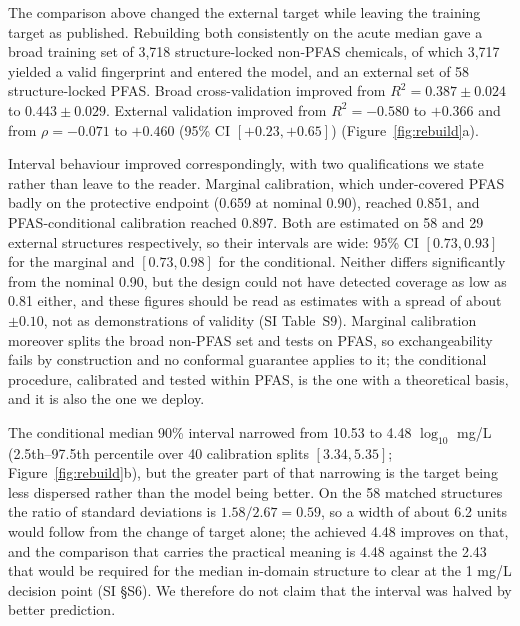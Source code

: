 \documentclass[preprint,12pt]{elsarticle}
\begin{document}
The comparison above changed the external target while leaving the training
target as published. Rebuilding both consistently on the acute median gave a
broad training set of 3{,}718 structure-locked non-PFAS chemicals, of which
3{,}717 yielded a valid fingerprint and entered the model, and an
external set of 58 structure-locked PFAS. Broad cross-validation improved from
$R^2=0.387\pm0.024$ to $0.443\pm0.029$. External validation improved from
$R^2=-0.580$ to $+0.366$ and from $\rho=-0.071$ to $+0.460$ (95\% CI
$[+0.23,+0.65]$) (Figure~\ref{fig:rebuild}a).

Interval behaviour improved correspondingly, with two qualifications we state
rather than leave to the reader. Marginal calibration, which under-covered PFAS
badly on the protective endpoint (0.659 at nominal 0.90), reached 0.851, and
PFAS-conditional calibration reached 0.897. Both are estimated on 58 and 29
external structures respectively, so their intervals are wide: 95\% CI
$[0.73,0.93]$ for the marginal and $[0.73,0.98]$ for the conditional. Neither
differs significantly from the nominal 0.90, but the design could not have
detected coverage as low as 0.81 either, and these figures should be read as
estimates with a spread of about $\pm0.10$, not as demonstrations of validity
(SI Table~S9). Marginal calibration
moreover splits the broad non-PFAS set and tests on PFAS, so exchangeability
fails by construction and no conformal guarantee applies to it; the conditional
procedure, calibrated and tested within PFAS, is the one with a theoretical
basis, and it is also the one we deploy.

The conditional median 90\% interval narrowed from 10.53 to 4.48 $\log_{10}$
mg/L (2.5th--97.5th percentile over 40 calibration splits $[3.34,5.35]$;
Figure~\ref{fig:rebuild}b), but the greater part of that narrowing is the
target being less dispersed rather than the model being better. On the 58
matched structures the ratio of standard deviations is $1.58/2.67=0.59$, so a
width of about 6.2 units would follow from the change of target alone; the
achieved 4.48 improves on that, and the comparison that carries the practical
meaning is 4.48 against the 2.43 that would be required for the median
in-domain structure to clear at the 1 mg/L decision point (SI \S S6). We therefore do not claim that the interval was halved by
better prediction.
\end{document}
